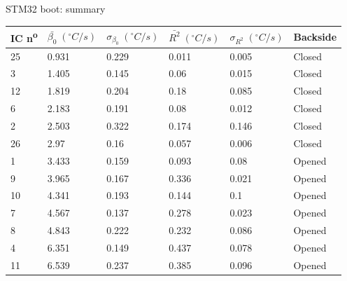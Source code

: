 
\begin{frame}{STM32 boot: summary}
	\vspace{-3mm}
	\begin{table}[]
		\centering
		\begin{tabular}{|l|l|l|l|l|l|}
			\hline \rule{0pt}{12pt} IC n\textsuperscript{o} & $\bar{\beta_0} \; (^{\circ} C/s)$ & $\sigma_{\beta_0} \; (^{\circ} C/s)$ & $\bar{R^2} \; (^{\circ} C/s)$ & $\sigma_{R^2} \; (^{\circ} C/s)$ & Backside \\ \hline
			25       & 0.931  & 0.229  & 0.011    &  0.005    & Closed           \\ \hline
			3         & 1.405  & 0.145  & 0.06      &  0.015    & Closed            \\ \hline
			12       & 1.819  & 0.204  & 0.18      &	0.085  & Closed            \\ \hline
			6         & 2.183  & 0.191  & 0.08      &	0.012   & Closed            \\ \hline
			2         & 2.503  & 0.322  & 0.174    &  0.146    & Closed            \\ \hline
			26       & 2.97    & 0.16    & 0.057    &  0.006    & Closed            \\ \hline
			1         & 3.433  & 0.159  & 0.093    &  0.08      & Opened         \\ \hline
			9         & 3.965  & 0.167  & 0.336    &  0.021    & Opened         \\ \hline
			10       & 4.341  & 0.193  & 0.144    &  0.1        & Opened         \\ \hline
			7         & 4.567  & 0.137  & 0.278    &  0.023    & Opened         \\ \hline
			8         & 4.843  & 0.222  & 0.232    &  0.086    & Opened         \\ \hline
			4         & 6.351  & 0.149  & 0.437    &  0.078    & Opened         \\ \hline
			11       & 6.539  & 0.237  & 0.385    &  0.096    & Opened         \\ \hline
		\end{tabular}
	\end{table}
\end{frame}

